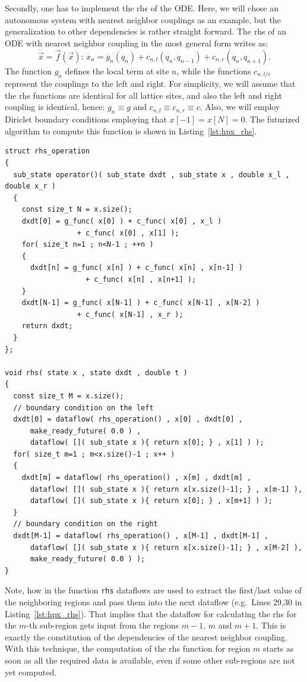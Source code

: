 \documentclass[10pt]{elsarticle}
\begin{document}
Secondly, one has to implement the rhs of the ODE.
Here, we will chose an autonomous system with nearest neighbor couplings as an example, but the generalization to other dependencies is rather straight forward.
The rhs of an ODE with nearest neighbor coupling in the most general form writes as:
\begin{equation}
 \dot{\vec x} = \vec f(\vec x):\, x_n = g_n(q_n) + c_{n,l}(q_{n},q_{n-1}) + c_{n,r}(q_{n},q_{n+1}).
\end{equation} 
The function $g_n$ defines the local term at site $n$, while the functions $c_{n,l/r}$ represent the couplings to the left and right.
For simplicity, we will assume that the rhs functions are identical for all lattice sites, and also the left and right coupling is identical, hence: $g_n \equiv g$ and $c_{n,l} \equiv c_{n,r} \equiv c$.
Also, we will employ Diriclet boundary conditions employing that $x[-1] = x[N] = 0$.
The futurized algorithm to compute this function is shown in Listing~\ref{lst:hpx_rhs}.
\begin{lstlisting}[label=lst:hpx_rhs,caption=Futurized rhs function ,float=t]
struct rhs_operation
{
  sub_state operator()( sub_state dxdt , sub_state x , double x_l , double x_r )
  {
    const size_t N = x.size();
    dxdt[0] = g_func( x[0] ) + c_func( x[0] , x_l ) 
			     + c_func( x[0] , x[1] );
    for( size_t n=1 ; n<N-1 ; ++n )
    {
      dxdt[n] = g_func( x[n] ) + c_func( x[n] , x[n-1] ) 
			       + c_func( x[n] , x[n+1] );
    }
    dxdt[N-1] = g_func( x[N-1] ) + c_func( x[N-1] , x[N-2] ) 
				 + c_func( x[N-1] , x_r );
    return dxdt;
  }
};

void rhs( state x , state dxdt , double t )
{
  const size_t M = x.size();
  // boundary condition on the left
  dxdt[0] = dataflow( rhs_operation() , x[0] , dxdt[0] , 
      make_ready_future( 0.0 ) ,
      dataflow( []( sub_state x ){ return x[0]; } , x[1] ) );
  for( size_t m=1 ; m<x.size()-1 ; x++ )
  {
    dxdt[m] = dataflow( rhs_operation() , x[m] , dxdt[m] , 
      dataflow( []( sub_state x ){ return x[x.size()-1]; } , x[m-1] ),
      dataflow( []( sub_state x ){ return x[0]; } , x[m+1] ) );
  }
  // boundary condition on the right
  dxdt[M-1] = dataflow( rhs_operation() , x[M-1] , dxdt[M-1] , 
      dataflow( []( sub_state x ){ return x[x.size()-1]; } , x[M-2] ),
      make_ready_future( 0.0 ) );
}
\end{lstlisting}
Note, how in the function \lstinline+rhs+ dataflows are used to extract the first/last value of the neighboring regions and pass them into the next dataflow (e.g.\ Lines 29,30 in Listing~\ref{lst:hpx_rhs}).
That implies that the dataflow for calculating the rhs for the $m$-th sub-region gets input from the regions $m-1$, $m$ and $m+1$.
This is exactly the constitution of the dependencies of the nearest neighbor coupling.
With this technique, the computation of the rhs function for region $m$ starts as soon as all the required data is available, even if some other sub-regions are not yet computed.
\end{document}
